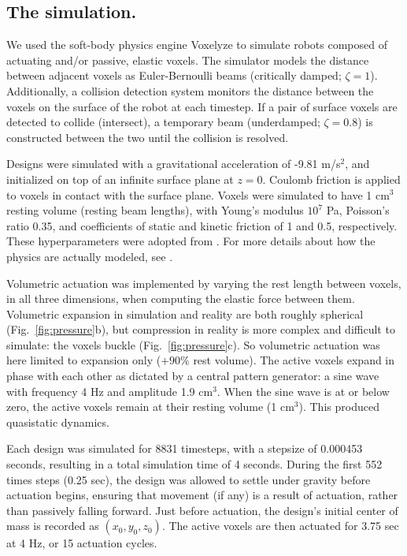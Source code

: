 \subsection{The simulation.}

We used the soft-body physics engine Voxelyze \cite{hiller2014dynamic} to simulate robots composed of actuating and/or passive, elastic voxels.
The simulator models the distance between adjacent voxels as Euler-Bernoulli beams (critically damped; $\zeta=1$).
Additionally, a collision detection system monitors the distance between the voxels on the surface of the robot at each timestep.
If a pair of surface voxels are detected to collide (intersect), a temporary beam (underdamped; $\zeta=0.8$) is constructed between the two until the collision is resolved. 

Designs were simulated with a gravitational acceleration of -9.81 m/s$^2$, and initialized on top of an infinite surface plane at $z=0$.
Coulomb friction is applied to voxels in contact with the surface plane.
Voxels were simulated to have 1 cm$^3$ resting volume (resting beam lengths), with Young's modulus $10^7$ Pa, Poisson's ratio 0.35, 
and coefficients of static and kinetic friction of 1 and 0.5, respectively.
These hyperparameters were adopted from \cite{kriegman2019automated}.
For more details about how the physics are actually modeled, see \cite{hiller2014dynamic}.

Volumetric actuation was implemented by varying the rest length between voxels, in all three dimensions, when computing the elastic force between them.
Volumetric expansion in simulation and reality are both roughly spherical
(Fig.~\ref{fig:pressure}b), but compression in reality is more complex
and difficult to simulate: 
the voxels buckle (Fig.~\ref{fig:pressure}c).
So volumetric actuation was here limited to expansion only ($+90\%$ rest volume).
The active voxels expand in phase with each other 
as dictated by
a central pattern generator:
a sine wave with frequency 4 Hz and amplitude 1.9 cm$^3$.
When the sine wave is at or below zero, the active voxels remain at their resting volume (1 cm$^3$).
This produced quasistatic dynamics.

Each design was simulated for 8831 timesteps, with a stepsize of 0.000453 seconds, resulting in a total simulation time of 4 seconds.
During the first 552 times steps (0.25 sec), the design was allowed to settle under gravity before actuation begins, ensuring that movement (if any) is a result of actuation, rather than passively falling forward.
Just before actuation, the design's initial center of mass is recorded as $(x_0, y_0, z_0)$.
The active voxels are then actuated for 3.75 sec at 4 Hz, or 15 actuation cycles.

